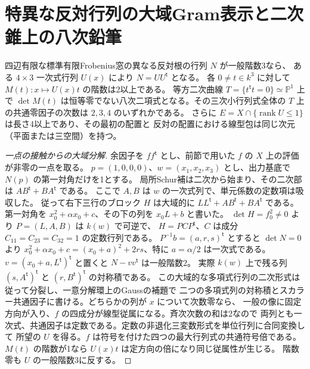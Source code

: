 \section{特異な反対行列の大域Gram表示と二次錐上の八次鉛筆}
\label{sec:opposite-gram-pencil}
\begin{theorem}\label{thm:opposite-gram-pencil}
四辺有限な標準有限Frobenius窓の異なる反対根の行列 $N$ が一般階数3なら、
ある $4\times3$ 一次式行列 $U(x)$ により $N=UU^{\mathsf t}$ となる。
各 $0\ne t\in k^3$ に対して $M(t):x\mapsto U(x)t$ の階数は2以上である。
等方二次曲線 $T=\{t^{\mathsf t}t=0\}\simeq\mathbb P^1$ 上で
$\det M(t)$ は恒等零でない八次二項式となる。その三次小行列式全体の
$T$ 上の共通零因子の次数は $2,3,4$ のいずれかである。
さらに $E=X\cap\{\operatorname{rank} U\le1\}$ は長さ4以上であり、その最初の配置と
反対の配置における線型包は同じ次元（平面または三空間）を持つ。
\end{theorem}

\begin{proof}[一点の接触からの大域分解]
余因子を $ff^{\mathsf t}$ とし、前節で用いた $f$ の $X$ 上の評価が非零の一点を取る。
$p=(1,0,0,0)$、$w=(x_1,x_2,x_3)$ とし、出力基底で $N(p)$ の第一対角だけを1とする。
局所Schur補は二次から始まり、その二次部は $A B^{\mathsf t}+B A^{\mathsf t}$ である。
ここで $A,B$ は $w$ の一次式列で、単元係数の定数項は吸収した。
従って右下三行のブロック $H$ は大域的に
$LL^{\mathsf t}+AB^{\mathsf t}+BA^{\mathsf t}$ である。第一対角を
$x_0^2+\alpha x_0+c$、その下の列を $x_0L+b$ と書いた。
$\det H=f_0^2\ne0$ より $P=(L,A,B)$ は $k(w)$ で可逆で、
$H=P C P^{\mathsf t}$、$C$ は成分 $C_{11}=C_{23}=C_{32}=1$ の定数行列である。
$P^{-1}b=(a,r,s)^{\mathsf t}$ とすると $\det N=0$ より
$x_0^2+\alpha x_0+c=(x_0+a)^2+2rs$、特に $a=\alpha/2$ は一次式である。
$v=(x_0+a,L^{\mathsf t})^{\mathsf t}$ と置くと $N-vv^{\mathsf t}$ は一般階数2。
実際 $k(w)$ 上で残る列 $(s,A^{\mathsf t})^{\mathsf t}$ と
$(r,B^{\mathsf t})^{\mathsf t}$ の対称積である。
この大域的な多項式行列の二次形式は従って分裂し、一意分解環上のGaussの補題で
二つの多項式列の対称積とスカラー共通因子に書ける。どちらかの列が $x$ について次数零なら、
一般の像に固定方向が入り、$f$ の四成分が線型従属になる。斉次次数の和は2なので
両列とも一次式、共通因子は定数である。定数の非退化三変数形式を単位行列に合同変換して
所望の $U$ を得る。$f$ は符号を付けた四つの最大行列式の共通符号倍である。
$M(t)$ の階数が1なら $U(x)t$ は定方向の倍になり同じ従属性が生じる。
階数零も $U$ の一般階数3に反する。
\end{proof}


